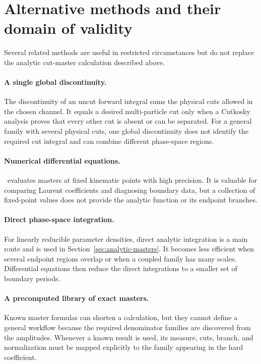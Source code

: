 \section{Alternative methods and their domain of validity}
\label{app:alternative-methods}

Several related methods are useful in restricted circumstances but do not
replace the analytic cut-master calculation described above.

\paragraph{A single global discontinuity.}
The discontinuity of an uncut forward integral sums the physical cuts allowed
in the chosen channel.  It equals a desired multi-particle cut only when a
Cutkosky analysis proves that every other cut is absent or can be separated.
For a general family with several physical cuts, one global discontinuity does
not identify the required cut integral and can combine different phase-space
regions.

\paragraph{Numerical differential equations.}
\AMFlow\ evaluates masters at fixed kinematic points with high precision.  It
is valuable for comparing Laurent coefficients and diagnosing boundary data,
but a collection of fixed-point values does not provide the analytic function
or its endpoint branches.

\paragraph{Direct phase-space integration.}
For linearly reducible parameter densities, direct analytic integration is a
main route and is used in Section~\ref{sec:analytic-masters}.  It becomes less
efficient when several endpoint regions overlap or when a coupled family has
many scales.  Differential equations then reduce the direct integrations to a
smaller set of boundary periods.

\paragraph{A precomputed library of exact masters.}
Known master formulas can shorten a calculation, but they cannot define a
general workflow because the required denominator families are discovered
from the amplitudes.  Whenever a known result is used, its measure, cuts,
branch, and normalization must be mapped explicitly to the family appearing
in the hard coefficient.

